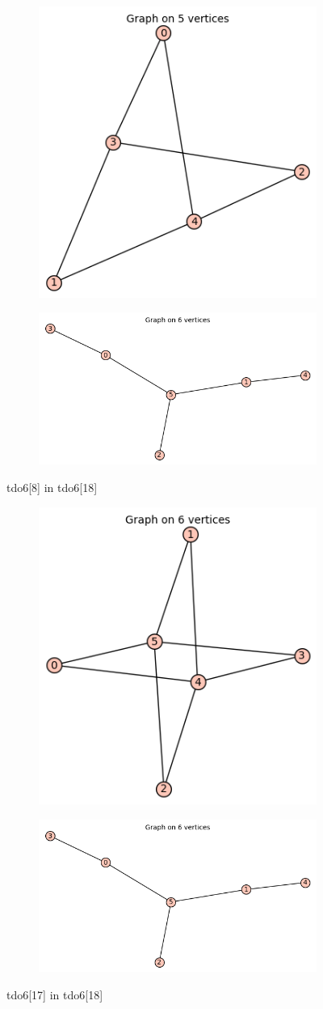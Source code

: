 \documentclass[12pt, a4paper]{article}
\begin{document}
\begin{center}
\begin{figure}[!htb]
\centering
\begin{subfigure}{0.5\textwidth}
  \centering
  \includegraphics[width=0.5\linewidth]{tdo6[8]}
\end{subfigure}%
\begin{subfigure}{0.5\textwidth}
  \centering
  \includegraphics[width=0.5\linewidth]{tdo6[18]}
\end{subfigure}
\caption{tdo6[8] in tdo6[18]}
\label{fig:test}
\end{figure}

\begin{figure}[!htb]
\centering
\begin{subfigure}{0.5\textwidth}
  \centering
  \includegraphics[width=0.5\linewidth]{tdo6[17]}
\end{subfigure}%
\begin{subfigure}{0.5\textwidth}
  \centering
  \includegraphics[width=0.5\linewidth]{tdo6[18]}
\end{subfigure}
\caption{tdo6[17] in tdo6[18]}
\label{fig:test}
\end{figure}


\end{center}
\end{document}
